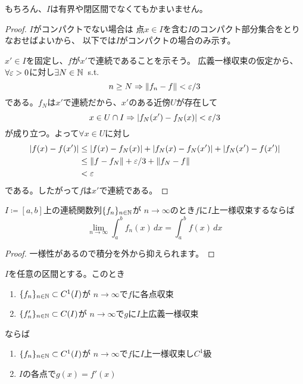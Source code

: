 \documentclass[report]{jlreq}
\begin{document}
もちろん、$I$は有界や閉区間でなくてもかまいません。

\begin{proof}
    $I$がコンパクトでない場合は
    点$x \in I$を含む$I$のコンパクト部分集合をとりなおせばよいから、
    以下では$I$がコンパクトの場合のみ示す。

    $x' \in I$を固定し、$f$が$x'$で連続であることを示そう。
    広義一様収束の仮定から、$\forall \varepsilon > 0$に対し$\exists N \in \mathbb{N}$\, s.t.
    \begin{equation}
        n \ge N \Rightarrow \| f_n - f \| < \varepsilon / 3
    \end{equation}
    である。$f_N$は$x'$で連続だから、$x'$のある近傍$U$が存在して
    \begin{equation}
        x \in U \cap I \Rightarrow |f_N(x') - f_N(x)| < \varepsilon / 3
    \end{equation}
    が成り立つ。よって$\forall x \in U$に対し
    \begin{equation}
        \begin{split}
            |f(x) - f(x')|
                &\le |f(x) - f_N(x)| + |f_N(x) - f_N(x')| + |f_N(x') - f(x')| \\
                &\le \| f - f_N \| + \varepsilon / 3 + \| f_N - f \| \\
                &< \varepsilon
        \end{split}
    \end{equation}
    である。したがって$f$は$x'$で連続である。
\end{proof}

\begin{theorem}[項別積分]
    $I \coloneqq [a, b]$上の連続関数列$\{ f_n \}_{n \in \mathbb{N}}$が
    $n \to \infty$のとき$f$に$I$上一様収束するならば
    \begin{equation}
        \lim_{n \to \infty} \int_a^b f_n(x)\, dx = \int_a^b f(x)\, dx
    \end{equation}
\end{theorem}

\begin{proof}
    一様性があるので積分を外から抑えられます。
\end{proof}

\begin{theorem}[項別微分]
    $I$を任意の区間とする。このとき
    \begin{enumerate}
        \item $\{ f_n \}_{n \in \mathbb{N}} \subset C^1(I)$が
            $n \to \infty$で$f$に各点収束
        \item $\{ f_n' \}_{n \in \mathbb{N}} \subset C(I)$が
            $n \to \infty$で$g$に$I$上広義一様収束
    \end{enumerate}
    ならば
    \begin{enumerate}
        \item $\{ f_n \}_{n \in \mathbb{N}} \subset C^1(I)$が
            $n \to \infty$で$f$に$I$上一様収束し$C^1$級
        \item $I$の各点で$g(x) = f'(x)$
    \end{enumerate}
\end{theorem}
\end{document}
